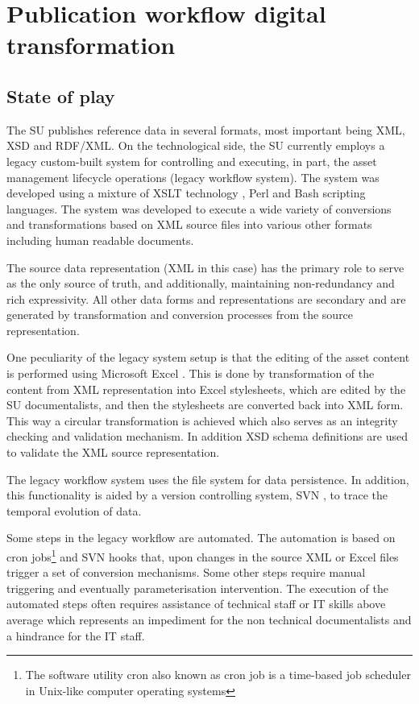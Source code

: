 \section{Publication workflow digital transformation}
\label{sec:context}


	\subsection{State of play}
	The SU publishes reference data in several formats, most important being XML, XSD and RDF/XML. On the technological side, the SU currently employs a legacy custom-built system for controlling and executing, in part, the asset management lifecycle operations (legacy workflow system). The system was developed using a mixture of XSLT technology \cite{xslt3-Kay}, Perl and Bash scripting languages. The system was developed to execute a wide variety of conversions and transformations based on XML source files into various other formats including human readable documents.
	 
	The source data representation (XML in this case) has the primary role to serve as the only source of truth, and additionally, maintaining non-redundancy and rich expressivity. All other data forms and representations are secondary and are generated by transformation and conversion processes from the source representation.
	 
	One peculiarity of the legacy system setup is that the editing of the asset content is performed using Microsoft Excel \citep{excel}. This is done by transformation of the content from XML representation into Excel stylesheets, which are edited by the SU documentalists, and then the stylesheets are converted back into XML form. This way a circular transformation is achieved which also serves as an integrity checking and validation mechanism. In addition XSD schema definitions are used to validate the XML source representation.
	 
	The legacy workflow system uses the file system for data persistence. In addition, this functionality is aided by a version controlling system, SVN \cite{svn}, to trace the temporal evolution of data.
	 
	Some steps in the legacy workflow are automated. The automation is based on cron jobs\footnote{The software utility cron also known as cron job is a time-based job scheduler in Unix-like computer operating systems} and SVN hooks that, upon changes in the source XML or Excel files trigger a set of conversion mechanisms.  Some other steps require manual triggering and eventually parameterisation intervention. The execution of the automated steps often requires assistance of technical staff or IT skills above average which represents an impediment for the non technical documentalists and a hindrance for the IT staff.
	 
